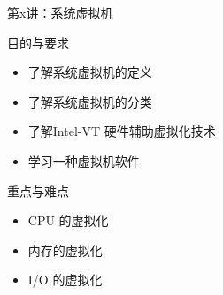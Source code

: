 

\renewcommand{\tabularxcolumn}[1]{m{#1}}

\begin{frame}{第x讲：系统虚拟机}
  \begin{block}{目的与要求}
    \begin{itemize}
      \item 了解系统虚拟机的定义
      \item 了解系统虚拟机的分类
      \item 了解Intel-VT 硬件辅助虚拟化技术
      \item 学习一种虚拟机软件
    \end{itemize}
  \end{block}
  \begin{block}{重点与难点}
    \begin{itemize}
      \item CPU 的虚拟化
      \item 内存的虚拟化
      \item I/O 的虚拟化
    \end{itemize}
  \end{block}
\end{frame}
